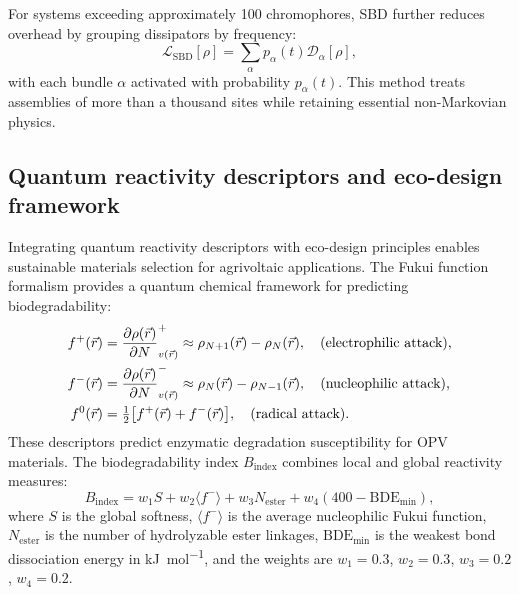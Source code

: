 For systems exceeding approximately 100 chromophores, SBD further reduces overhead by grouping dissipators by frequency:
\begin{equation}\label{eq:sbd_operator}
\mathcal{L}_{\mathrm{SBD}}[\rho]=\sum_{\alpha}p_{\alpha}(t)\mathcal{D}_{\alpha}[\rho],
\end{equation}
with each bundle $\alpha$ activated with probability $p_{\alpha}(t)$. This method treats assemblies of more than a thousand sites while retaining essential non-Markovian physics.

\subsection{Quantum reactivity descriptors and eco-design framework}

Integrating quantum reactivity descriptors with eco-design principles enables sustainable materials selection for agrivoltaic applications. The Fukui function formalism provides a quantum chemical framework for predicting biodegradability:
\begin{align}
f^+(\vec{r}) &= \pdv{\rho(\vec{r})}{N}_{v(\vec{r})}^+ \approx \rho_{N+1}(\vec{r}) - \rho_N(\vec{r}), \quad \text{(electrophilic attack),}\label{eq:fukui_plus_new}\\
f^-(\vec{r}) &= \pdv{\rho(\vec{r})}{N}_{v(\vec{r})}^- \approx \rho_N(\vec{r}) - \rho_{N-1}(\vec{r}), \quad \text{(nucleophilic attack),}\label{eq:fukui_minus_new}\\
f^0(\vec{r}) &= \tfrac{1}{2}\qty[f^+(\vec{r}) + f^-(\vec{r})], \quad \text{(radical attack).}\label{eq:fukui_zero_new}
\end{align}
These descriptors predict enzymatic degradation susceptibility for OPV materials. The biodegradability index $B_{\mathrm{index}}$ combines local and global reactivity measures:
\begin{equation}\label{eq:biodegradability_index}
B_{\mathrm{index}} = w_1 S + w_2 \langle f^- \rangle + w_3 N_{\mathrm{ester}} + w_4 (400 - \mathrm{BDE}_{\mathrm{min}}),
\end{equation}
where $S$ is the global softness, $\langle f^- \rangle$ is the average nucleophilic Fukui function, $N_{\mathrm{ester}}$ is the number of hydrolyzable ester linkages, $\mathrm{BDE}_{\mathrm{min}}$ is the weakest bond dissociation energy in \si{\kilo\joule\per\mole}, and the weights are $w_1 = 0.3$, $w_2 = 0.3$, $w_3 = 0.2$, $w_4 = 0.2$.

